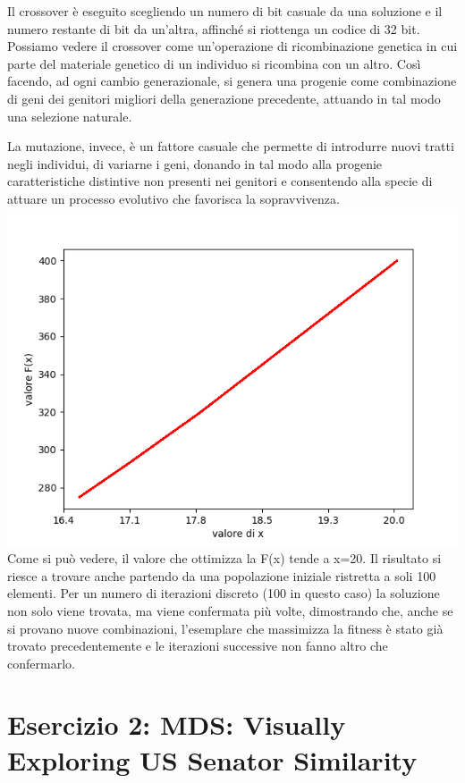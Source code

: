 			Il crossover è eseguito scegliendo un numero di bit casuale da una soluzione e il numero restante di bit da un'altra, affinché si riottenga un codice di 32 bit. Possiamo vedere il crossover come un'operazione di ricombinazione genetica in cui parte del materiale genetico di un individuo si ricombina con un altro. Così facendo, ad ogni cambio generazionale, si genera una progenie come combinazione di geni dei genitori migliori della generazione precedente, attuando in tal modo una selezione naturale.\par
			La mutazione, invece, è un fattore casuale che permette di introdurre nuovi tratti negli individui, di variarne i geni, donando in tal modo alla progenie caratteristiche distintive non presenti nei genitori e consentendo alla specie di attuare un processo evolutivo che favorisca la sopravvivenza.
			\includegraphics[scale=0.80]{fitness.png}
			Come si può vedere, il valore che ottimizza la F(x) tende a x=20. Il risultato si riesce a trovare anche partendo da una popolazione iniziale ristretta a soli 100 elementi. Per un numero di iterazioni discreto (100 in questo caso) la soluzione non solo viene trovata, ma viene confermata più volte, dimostrando che, anche se si provano nuove combinazioni, l'esemplare che massimizza la fitness è stato già trovato precedentemente e le iterazioni successive non fanno altro che confermarlo.
	\section{Esercizio 2: MDS: Visually Exploring US Senator Similarity}
		\label{sec:es2}
